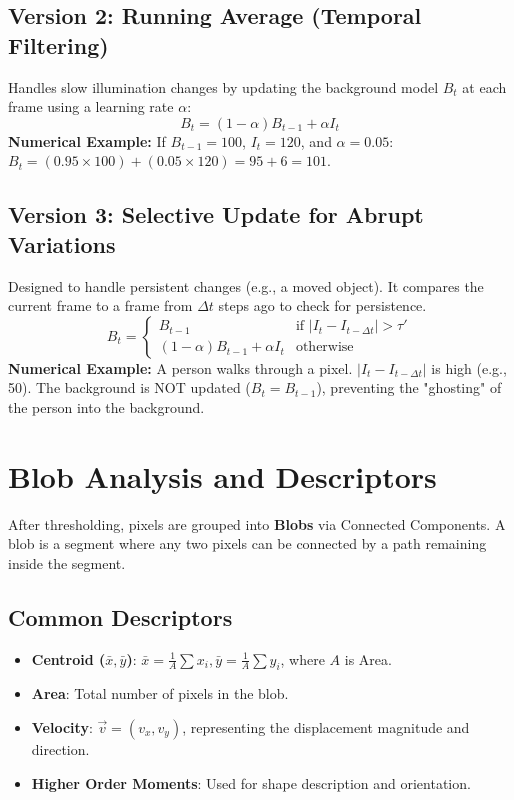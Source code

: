 \documentclass{report}
\begin{document}
\subsection{Version 2: Running Average (Temporal Filtering)}
Handles slow illumination changes by updating the background model $B_t$ at each frame using a learning rate $\alpha$:
\begin{equation}
    B_t = (1-\alpha)B_{t-1} + \alpha I_t
\end{equation}
\textbf{Numerical Example:} If $B_{t-1}=100$, $I_t=120$, and $\alpha=0.05$:
$B_t = (0.95 \times 100) + (0.05 \times 120) = 95 + 6 = 101$.

\subsection{Version 3: Selective Update for Abrupt Variations}
Designed to handle persistent changes (e.g., a moved object). It compares the current frame to a frame from $\Delta t$ steps ago to check for persistence.
\begin{equation}
    B_t = \begin{cases} B_{t-1} & \text{if } |I_t - I_{t-\Delta t}| > \tau' \\ (1-\alpha)B_{t-1} + \alpha I_t & \text{otherwise} \end{cases}
\end{equation}
\textbf{Numerical Example:} A person walks through a pixel. $|I_t - I_{t-\Delta t}|$ is high (e.g., 50). The background is NOT updated ($B_t = B_{t-1}$), preventing the "ghosting" of the person into the background.

\section{Blob Analysis and Descriptors}
After thresholding, pixels are grouped into \textbf{Blobs} via Connected Components. A blob is a segment where any two pixels can be connected by a path remaining inside the segment.

\subsection{Common Descriptors}
\begin{itemize}
    \item \textbf{Centroid ($\bar{x}, \bar{y}$)}: $\bar{x} = \frac{1}{A}\sum x_i, \bar{y} = \frac{1}{A}\sum y_i$, where $A$ is Area.
    \item \textbf{Area}: Total number of pixels in the blob.
    \item \textbf{Velocity}: $\vec{v} = (v_x, v_y)$, representing the displacement magnitude and direction.
    \item \textbf{Higher Order Moments}: Used for shape description and orientation.
\end{itemize}
\end{document}
